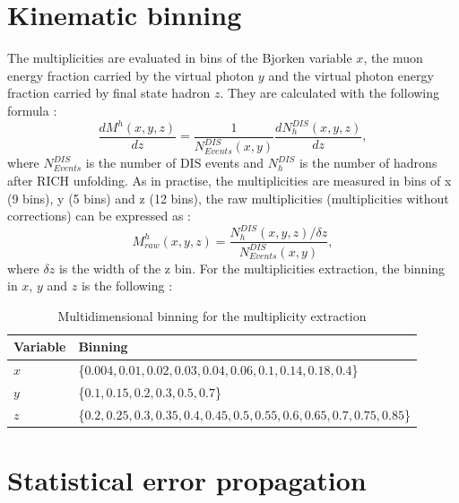 
\section{Kinematic binning}

The multiplicities are evaluated in bins of the Bjorken variable $x$, the muon energy fraction carried by the virtual photon $y$ and the virtual photon energy fraction carried by final state hadron $z$. They are calculated with the following formula :
%
\begin{equation}
  \frac{dM^h(x,y,z)}{dz}=\frac{1}{N^{DIS}_{Events}(x,y)}\frac{dN^{DIS}_{h}(x,y,z)}{dz},
\end{equation}
%
where $N^{DIS}_{Events}$ is the number of DIS events and $N^{DIS}_{h}$ is the number of
hadrons after RICH unfolding. As in practise, the multiplicities are measured in bins of
x (9 bins), y (5 bins) and z (12 bins), the raw multiplicities (multiplicities without corrections) can be expressed as :
%
\begin{equation}
  M^h_{raw}(x,y,z) = \frac{N^{DIS}_{h}(x,y,z)/\delta z}{N^{DIS}_{Events}(x,y)},
\end{equation}
%
where $\delta z$ is the width of the z bin. For the multiplicities extraction, the binning in
$x$, $y$ and $z$ is the following :

\begin{table}[!h]
  \centering
  \caption{Multidimensional binning for the multiplicity extraction}
  \label{tab:kinbinning}
  \begin{tabular}{ll}
    \hline
    \hline
    Variable & Binning \\
    \hline
    \hline
    $x$ & \{$0.004,0.01,0.02,0.03,0.04,0.06,0.1,0.14,0.18,0.4$\} \\
    $y$ & \{$0.1,0.15,0.2,0.3,0.5,0.7$\} \\
    $z$ & \{$0.2,0.25,0.3,0.35,0.4,0.45,0.5,0.55,0.6,0.65,0.7,0.75,0.85$\} \\
    \hline
    \hline
  \end{tabular}
\end{table}


\section{Statistical error propagation}

